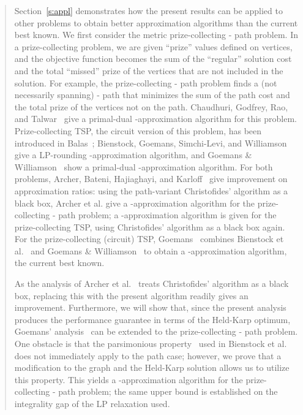 \documentclass[11pt,letterpaper]{article}
\newcommand{\st}{\mbox{-} }
\begin{document}
\begin{quote}
Section~\ref{s:appl} demonstrates how the present results can be applied to other problems to obtain better approximation algorithms than the current best known. We first consider the metric prize-collecting \st path problem. In a prize-collecting problem, we are given ``prize'' values defined on vertices, and the objective function becomes the sum of the ``regular'' solution cost and the total ``missed'' prize of the vertices that are not included in the solution. For example, the prize-collecting \st path problem finds a (not necessarily spanning) \st path that minimizes the sum of the path cost and the total prize of the vertices not on the path. Chaudhuri, Godfrey, Rao, and Talwar~\cite{CGRT} give a primal-dual -approximation algorithm for this problem. Prize-collecting TSP, the circuit version of this problem, has been introduced in Balas~\cite{B}; Bienstock, Goemans, Simchi-Levi, and Williamson~\cite{BGSW} give a LP-rounding -approximation algorithm, and Goemans \& Williamson~\cite{GW} show a primal-dual -approximation algorithm. For both problems, Archer, Bateni, Hajiaghayi, and Karloff~\cite{ABHK} give improvement on approximation ratios: using the path-variant Christofides' algorithm as a black box, Archer et al. give a -approximation algorithm for the prize-collecting \st path problem; a -approximation algorithm is given for the prize-collecting TSP, using Christofides' algorithm as a black box again. For the prize-collecting (circuit) TSP, Goemans~\cite{G:pc} combines Bienstock et al.~\cite{BGSW} and Goemans \& Williamson~\cite{GW} to obtain a -approximation algorithm, the current best known.

As the analysis of Archer et al.~\cite{ABHK} treats Christofides' algorithm as a black box, replacing this with the present algorithm readily gives an improvement. Furthermore, we will show that, since the present analysis produces the performance guarantee in terms of the Held-Karp optimum, Goemans' analysis~\cite{G:pc} can be extended to the prize-collecting \st path problem. One obstacle is that the parsimonious property~\cite{GB} used in Bienstock et al. does not immediately apply to the path case; however, we prove that a modification to the graph and the Held-Karp solution allows us to utilize this property. This yields a -approximation algorithm for the prize-collecting \st path problem; the same upper bound is established on the integrality gap of the LP relaxation used.


\end{quote}
\end{document}
